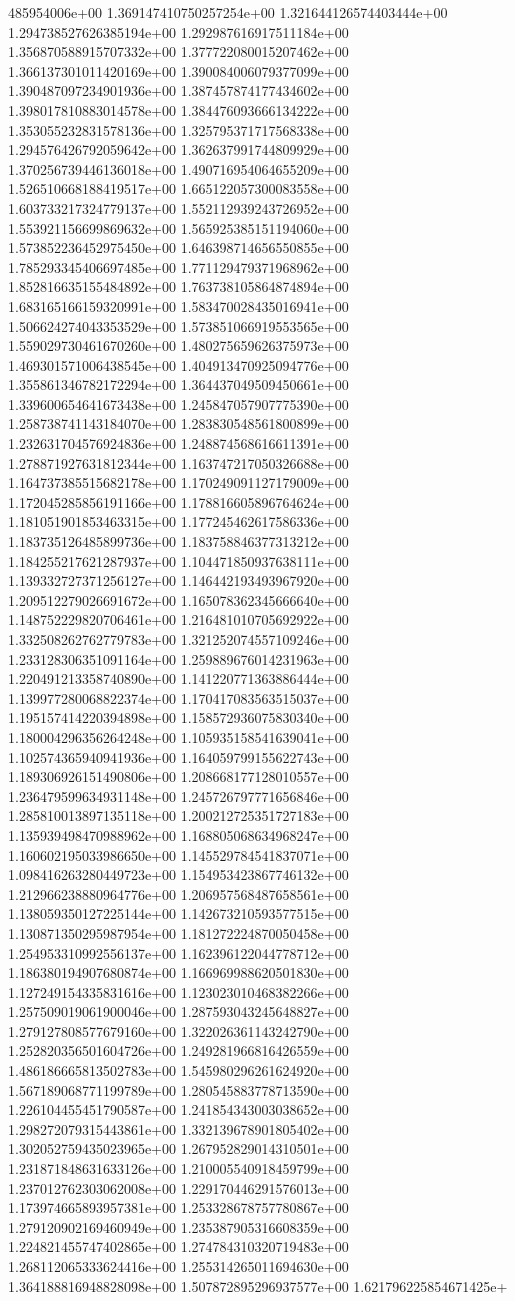 485954006e+00	1.369147410750257254e+00	1.321644126574403444e+00	1.294738527626385194e+00	1.292987616917511184e+00	1.356870588915707332e+00	1.377722080015207462e+00	1.366137301011420169e+00	1.390084006079377099e+00	1.390487097234901936e+00	1.387457874177434602e+00	1.398017810883014578e+00	1.384476093666134222e+00	1.353055232831578136e+00	1.325795371717568338e+00	1.294576426792059642e+00	1.362637991744809929e+00	1.370256739446136018e+00	1.490716954064655209e+00	1.526510668188419517e+00	1.665122057300083558e+00	1.603733217324779137e+00	1.552112939243726952e+00	1.553921156699869632e+00	1.565925385151194060e+00	1.573852236452975450e+00	1.646398714656550855e+00	1.785293345406697485e+00	1.771129479371968962e+00	1.852816635155484892e+00	1.763738105864874894e+00	1.683165166159320991e+00	1.583470028435016941e+00	1.506624274043353529e+00	1.573851066919553565e+00	1.559029730461670260e+00	1.480275659626375973e+00	1.469301571006438545e+00	1.404913470925094776e+00	1.355861346782172294e+00	1.364437049509450661e+00	1.339600654641673438e+00	1.245847057907775390e+00	1.258738741143184070e+00	1.283830548561800899e+00	1.232631704576924836e+00	1.248874568616611391e+00	1.278871927631812344e+00	1.163747217050326688e+00	1.164737385515682178e+00	1.170249091127179009e+00	1.172045285856191166e+00	1.178816605896764624e+00	1.181051901853463315e+00	1.177245462617586336e+00	1.183735126485899736e+00	1.183758846377313212e+00	1.184255217621287937e+00	1.104471850937638111e+00	1.139332727371256127e+00	1.146442193493967920e+00	1.209512279026691672e+00	1.165078362345666640e+00	1.148752229820706461e+00	1.216481010705692922e+00	1.332508262762779783e+00	1.321252074557109246e+00	1.233128306351091164e+00	1.259889676014231963e+00	1.220491213358740890e+00	1.141220771363886444e+00	1.139977280068822374e+00	1.170417083563515037e+00	1.195157414220394898e+00	1.158572936075830340e+00	1.180004296356264248e+00	1.105935158541639041e+00	1.102574365940941936e+00	1.164059799155622743e+00	1.189306926151490806e+00	1.208668177128010557e+00	1.236479599634931148e+00	1.245726797771656846e+00	1.285810013897135118e+00	1.200212725351727183e+00	1.135939498470988962e+00	1.168805068634968247e+00	1.160602195033986650e+00	1.145529784541837071e+00	1.098416263280449723e+00	1.154953423867746132e+00	1.212966238880964776e+00	1.206957568487658561e+00	1.138059350127225144e+00	1.142673210593577515e+00	1.130871350295987954e+00	1.181272224870050458e+00	1.254953310992556137e+00	1.162396122044778712e+00	1.186380194907680874e+00	1.166969988620501830e+00	1.127249154335831616e+00	1.123023010468382266e+00	1.257509019061900046e+00	1.287593043245648827e+00	1.279127808577679160e+00	1.322026361143242790e+00	1.252820356501604726e+00	1.249281966816426559e+00	1.486186665813502783e+00	1.545980296261624920e+00	1.567189068771199789e+00	1.280545883778713590e+00	1.226104455451790587e+00	1.241854343003038652e+00	1.298272079315443861e+00	1.332139678901805402e+00	1.302052759435023965e+00	1.267952829014310501e+00	1.231871848631633126e+00	1.210005540918459799e+00	1.237012762303062008e+00	1.229170446291576013e+00	1.173974665893957381e+00	1.253328678757780867e+00	1.279120902169460949e+00	1.235387905316608359e+00	1.224821455747402865e+00	1.274784310320719483e+00	1.268112065333624416e+00	1.255314265011694630e+00	1.364188816948828098e+00	1.507872895296937577e+00	1.621796225854671425e+